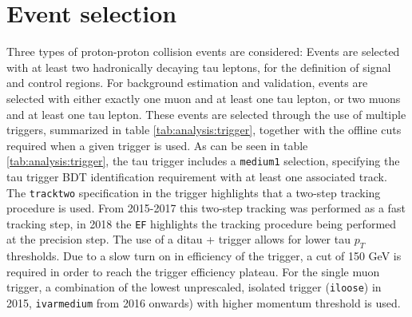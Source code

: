 \section{Event selection}
\label{sec:analysis:eventselection}
Three types of proton-proton collision events are considered: Events are selected with at least two hadronically decaying tau leptons, for the definition of signal and control regions.  For background estimation and validation, events are selected with either exactly one muon and at least one tau lepton, or two muons and at least one tau lepton. These events are selected through the use of multiple triggers,  summarized in table \ref{tab:analysis:trigger}, together with the offline cuts required when a given trigger is used.
As can be seen in table \ref{tab:analysis:trigger},  the tau trigger includes a \texttt{medium1} selection,  specifying the tau trigger \ac{BDT} identification requirement with at least one associated track.  The \texttt{tracktwo} specification in the trigger highlights that a two-step tracking procedure is used. From 2015-2017 this two-step tracking was performed as a fast tracking step,  in 2018 the \texttt{EF} highlights the tracking procedure being performed at the precision step. 
The use of a ditau + \Met trigger allows for lower tau $p_T$ thresholds.  Due to a slow turn on in efficiency of the \Met trigger,  a cut of 150 GeV is required in order to reach the trigger efficiency plateau. 
For the single muon trigger,  a combination of the lowest unprescaled,  isolated trigger (\texttt{iloose}) in 2015, \texttt{ivarmedium} from 2016 onwards) with higher momentum threshold is used. 

